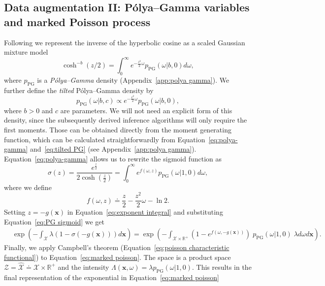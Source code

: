 \documentclass[twoside,11pt]{article}
\newcommand{\bx}{\boldsymbol{x}}
\newcommand{\PG}{p_{\scriptscriptstyle \mathrm{PG}}}
\newcommand{\R}{\mathbb{R}}
\newcommand{\X}{\mathcal{X}}
\begin{document}
\subsection{Data augmentation II: P\'olya--Gamma variables and marked Poisson process}
Following \citet{polson2013bayesian} we represent the inverse of the hyperbolic cosine as a scaled Gaussian mixture model 
\begin{equation}\label{eq:polya-gamma}
\cosh^{-b}(z/2)=\int_0^\infty e^{-\frac{z^2}{2}\omega}\PG(\omega\vert b,0) d\omega,
\end{equation}
where $\PG$ is a {\it P\'olya--Gamma} density (Appendix~\ref{app:polya gamma}). We further define the {\it tilted} P\'olya--Gamma density by
\begin{equation}\label{eq:tilted PG}
\PG(\omega\vert b,c)\propto e^{-\frac{c^2}{2}\omega}\PG(\omega\vert b,0),
\end{equation}
where $b>0$ and $c$ are parameters.  We will not need an explicit form of this density, since the subsequently derived inference algorithms will only require the first moments. Those can be obtained directly from the moment generating function, which can be calculated straightforwardly from Equation~\eqref{eq:polya-gamma} and~\eqref{eq:tilted PG} (see Appendix~\ref{app:polya gamma}). Equation~\eqref{eq:polya-gamma} allows us to rewrite the sigmoid function as
\begin{equation}\label{eq:PG sigmoid}
\sigma(z) = \frac{e^\frac{z}{2}}{2\cosh(\frac{z}{2})}= \int_{0}^\infty e^{f(\omega,z)}\PG(\omega\vert 1,0) d\omega,
\end{equation}
where we define 
\begin{equation}
f(\omega,z) \doteq \frac{z}{2} - \frac{z^2}{2}\omega - \ln 2. 
\end{equation}
Setting $z=-g(\bx)$ in Equation~\eqref{eq:exponent integral} and substituting Equation~\eqref{eq:PG sigmoid} we get
\begin{equation}\label{eq:marked poisson}
\begin{split}
& \exp\left(-\int_{\X} \lambda \left(1 - \sigma(-g(\bx))\right) d\bx \right)  = \exp\left(-\int_{\X\times \R^+}\left(1 - e^{f(\omega,-g(\bx))}\right) \;\PG(\omega\vert 1,0)\;  \lambda d\omega d\bx\right).
\end{split}
\end{equation}
Finally, we apply Campbell's theorem (Equation~\eqref{eq:poisson characteristic functional}) to Equation~\eqref{eq:marked poisson}. The space is a product space $\mathcal{Z}=\hat{\X}\doteq\X \times \R^+$ and the intensity $\Lambda(\bx,\omega) = \lambda \PG(\omega\vert 1, 0)$. This results in the final representation of the exponential in Equation~\eqref{eq:marked poisson}
\end{document}
